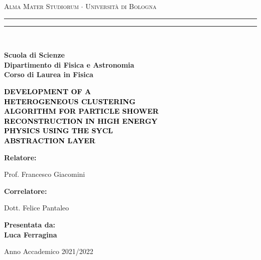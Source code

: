 \documentclass[12pt,a4paper]{report}
\begin{document}
\begin{titlepage}
\begin{center}
{{\Large{\textsc{Alma Mater Studiorum $\cdot$ Universit\`a di Bologna}}}} 
\rule[0.1cm]{15.8cm}{0.1mm}
\rule[0.5cm]{15.8cm}{0.6mm}
\\\vspace{3mm}

{\small{\bf Scuola di Scienze \\ 
Dipartimento di Fisica e Astronomia\\
Corso di Laurea in Fisica}}

\end{center}

\vspace{23mm}

\begin{center}\textcolor{black}{
{\LARGE{\bf DEVELOPMENT OF A \\ HETEROGENEOUS CLUSTERING \\ ALGORITHM FOR PARTICLE SHOWER \\ RECONSTRUCTION IN HIGH ENERGY \\ PHYSICS USING THE SYCL \\ ABSTRACTION LAYER \\}}
}\end{center}

\vspace{35mm} \par \noindent

\begin{minipage}[t]{0.47\textwidth}

\large{\bf Relatore: \vspace{2mm}

{Prof. Francesco Giacomini}}

\vspace{5mm}

\large{\bf Correlatore: \vspace{2mm}

{Dott. Felice Pantaleo}}

\end{minipage}
\hfill
\begin{minipage}[t]{0.47\textwidth}\raggedleft
{\large{\bf Presentata da:
\vspace{2mm}\\
Luca Ferragina}}
\end{minipage}

\vspace{18mm}

\begin{center}
Anno Accademico 2021/2022
\end{center}

\end{titlepage}
\end{document}

